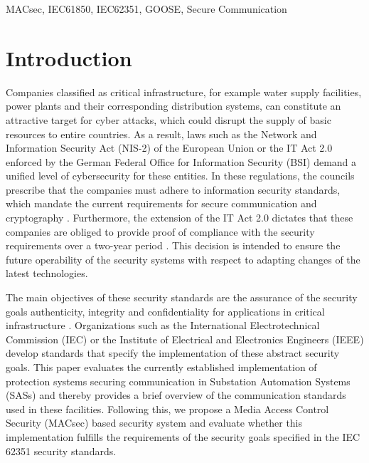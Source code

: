 \documentclass[conference, onecolumn, a4paper]{IEEEtran}
\begin{document}
\vspace{6 pt}

\begin{IEEEkeywords}
    MACsec, IEC61850, IEC62351, GOOSE, Secure Communication
\end{IEEEkeywords}

\section{Introduction}
\label{chapter:introduction}
\noindent Companies classified as critical infrastructure, for example water supply facilities, power plants and their corresponding distribution systems, 
can constitute an attractive target for cyber attacks, which could disrupt the supply of basic resources to entire countries. As a result, laws such as the 
Network and Information Security Act (NIS-2) \cite{NIS-2:2022} of the European Union or the IT Act 2.0 \cite{IT-Gesetz_2:2021} enforced by the German Federal 
Office for Information Security (BSI) demand a unified level of cybersecurity for these entities. In these regulations, the councils prescribe that the companies 
must adhere to information security standards, which mandate the current requirements for secure communication and cryptography \cite[p. 9]{BSI-ISMS:2017}. 
Furthermore, the extension of the IT Act 2.0 dictates that these companies are obliged to provide proof of compliance with the security requirements over a 
two-year period \cite[§11 (1e)]{IT-Gesetz_2:2021}. This decision is intended to ensure the future operability of the security systems with respect to adapting 
changes of the latest technologies. 

\smallskip
The main objectives of these security standards are the assurance of the security goals authenticity, integrity and confidentiality for applications in 
critical infrastructure \cite[§2 (13)]{IT-Gesetz_2:2021}. Organizations such as the International Electrotechnical Commission (IEC) or the Institute of 
Electrical and Electronics Engineers (IEEE) develop standards that specify the implementation of these abstract security goals. This paper evaluates the 
currently established implementation of protection systems securing communication in Substation Automation Systems (SASs) and thereby provides a brief 
overview of the communication standards used in these facilities. Following this, we propose a Media Access Control Security (MACsec) based security system 
and evaluate whether this implementation fulfills the requirements of the security goals specified in the IEC 62351 security standards. 
\end{document}
